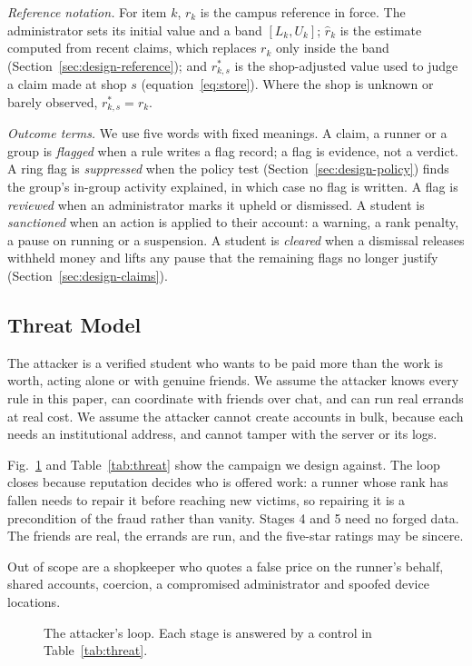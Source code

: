 \documentclass[journal]{IEEEtran}
\begin{document}
\emph{Reference notation.} For item $k$, $r_k$ is the campus reference in force.
The administrator sets its initial value and a band $[L_k,U_k]$;
$\hat r_k$ is the estimate computed from recent claims, which replaces $r_k$ only
inside the band (Section~\ref{sec:design-reference}); and $r^*_{k,s}$ is the
shop-adjusted value used to judge a claim made at shop $s$ (equation~\eqref{eq:store}).
Where the shop is unknown or barely observed, $r^*_{k,s}=r_k$.

\emph{Outcome terms.} We use five words with fixed meanings. A claim, a runner or a
group is \emph{flagged} when a rule writes a flag record; a flag is evidence, not a
verdict. A ring flag is \emph{suppressed} when the policy test
(Section~\ref{sec:design-policy}) finds the group's in-group activity explained, in
which case no flag is written. A flag is \emph{reviewed} when an administrator marks
it upheld or dismissed. A student is \emph{sanctioned} when an action is applied to
their account: a warning, a rank penalty, a pause on running or a suspension. A
student is \emph{cleared} when a dismissal releases withheld money and lifts any pause
that the remaining flags no longer justify (Section~\ref{sec:design-claims}).

\subsection{Threat Model}
The attacker is a verified student who wants to be paid more than the work is worth,
acting alone or with genuine friends. We assume the attacker knows every rule in this
paper, can coordinate with friends over chat, and can run real errands at real cost.
We assume the attacker cannot create accounts in bulk, because each needs an
institutional address, and cannot tamper with the server or its logs.

Fig.~\ref{fig:threat} and Table~\ref{tab:threat} show the campaign we design
against. The loop closes because reputation decides who is offered work: a runner
whose rank has fallen needs to repair it before reaching new victims, so repairing it
is a precondition of the fraud rather than vanity. Stages 4 and 5 need no forged data.
The friends are real, the errands are run, and the five-star ratings may be sincere.

Out of scope are a shopkeeper who quotes a false price on the runner's behalf,
shared accounts, coercion, a compromised administrator and spoofed device locations.

\begin{figure}[!t]
\centering

\caption{The attacker's loop. Each stage is answered by a control in
Table~\ref{tab:threat}.}
\label{fig:threat}
\end{figure}
\end{document}
